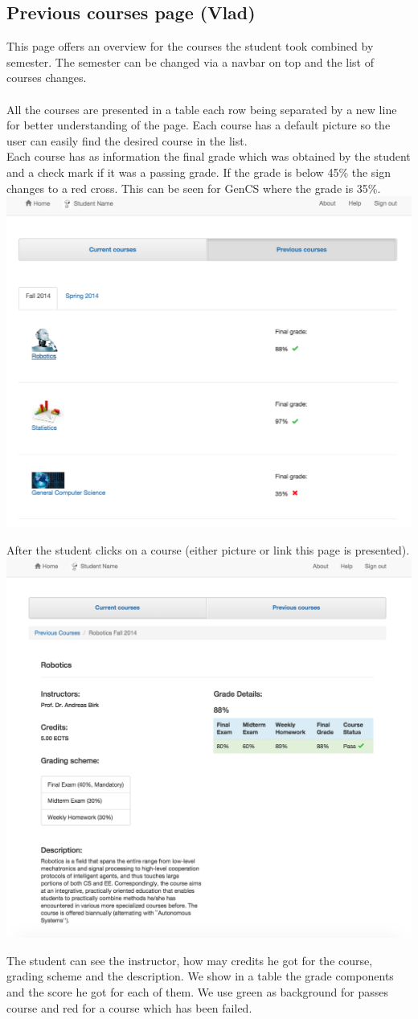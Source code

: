 \subsection{Previous courses page (Vlad)}

This page offers an overview for the courses the student took combined by semester. The semester can be changed via a navbar on top and the list of courses changes.\\\\
All the courses are presented in a table each row being separated by a new line for better understanding of the page. Each course has a default picture so the user can easily find the desired course in the list. \\
Each course has as information the final grade which was obtained by the student and a check mark if it was a passing grade. If the grade is below 45\% the sign changes to a red cross. This can be seen for GenCS where the grade is 35\%.\\
\includegraphics[width=.85\textwidth]{screenshots/PrevoiusCoursesOverview.png}

After the student clicks on a course (either picture or link this page is presented).\\

\includegraphics[width=.85\textwidth]{screenshots/PreviousCourseDetail.png}

The student can see the instructor, how may credits he got for the course, grading scheme and the description. We show in a table the grade components and the score he got for each of them. We use green as background for passes course and red for a course which has been failed.